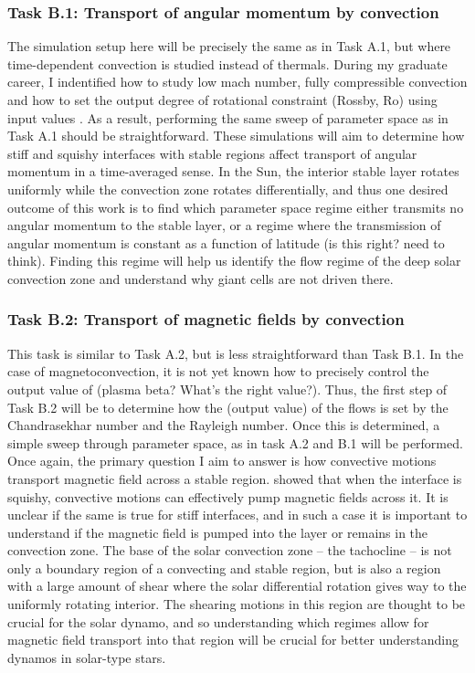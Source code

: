 \documentclass[aasms,12pt]{article}
\begin{document}
\subsubsection{Task B.1: Transport of angular momentum by convection}
The simulation setup here will be precisely the same as in Task A.1, but where time-dependent convection is studied instead of thermals.
During my graduate career, I indentified how to study low mach number, fully compressible convection \citep{anders&brown2017} and how to set the output degree of rotational constraint (Rossby, Ro) using input values \citep[][and Fig. \ref{fig:rossby_plot}]{anders&all2019}.
As a result, performing the same sweep of parameter space as in Task A.1 should be straightforward.
These simulations will aim to determine how stiff and squishy interfaces with stable regions affect transport of angular momentum in a time-averaged sense.
In the Sun, the interior stable layer rotates uniformly while the convection zone rotates differentially, and thus one desired outcome of this work is to find which parameter space regime either transmits no angular momentum to the stable layer, or a regime where the transmission of angular momentum is constant as a function of latitude (is this right? need to think).
Finding this regime will help us identify the flow regime of the deep solar convection zone and understand why giant cells are not driven there.

\subsubsection{Task B.2: Transport of magnetic fields by convection}
This task is similar to Task A.2, but is less straightforward than Task B.1.
In the case of magnetoconvection, it is not yet known how to precisely control the output value of (plasma beta? What's the right value?).
Thus, the first step of Task B.2 will be to determine how the (output value) of the flows is set by the Chandrasekhar number and the Rayleigh number.
Once this is determined, a simple sweep through parameter space, as in task A.2 and B.1 will be performed.
Once again, the primary question I aim to answer is how convective motions transport magnetic field across a stable region.
\citet{tobias&all1998} showed that when the interface is squishy, convective motions can effectively pump magnetic fields across it.
It is unclear if the same is true for stiff interfaces, and in such a case it is important to understand if the magnetic field is pumped into the layer or remains in the convection zone.
The base of the solar convection zone -- the tachocline -- is not only a boundary region of a convecting and stable region, but is also a region with a large amount of shear where the solar differential rotation gives way to the uniformly rotating interior.
The shearing motions in this region are thought to be crucial for the solar dynamo, and so understanding which regimes allow for magnetic field transport into that region will be crucial for better understanding dynamos in solar-type stars.
\end{document}
